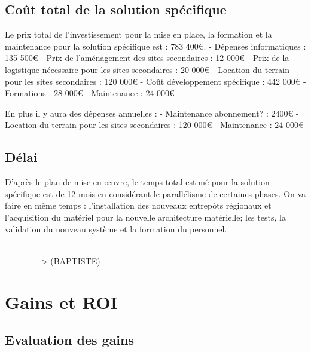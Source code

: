     \subsection{Coût total de la solution spécifique}

    Le prix total de l'investissement pour la mise en place, la formation et la maintenance pour la solution spécifique est : 783 400€.
          - Dépenses informatiques : 135 500€
          - Prix de l'aménagement des sites secondaires : 12 000€
          - Prix de la logistique nécessaire pour les sites secondaires : 20 000€
          - Location du terrain pour les sites secondaires : 120 000€
          - Coût développement spécifique : 442 000€
          - Formations : 28 000€
          - Maintenance : 24 000€

    En plus il y aura des dépenses annuelles :
          - Maintenance abonnement? : 2400€
          - Location du terrain pour les sites secondaires : 120 000€
          - Maintenance : 24 000€

        \subsection{Délai}

              D'après le plan de mise en œuvre, le temps total estimé pour la solution spécifique est de 12 mois en considérant le parallélisme de certaines phases. On va faire en même temps : l'installation des nouveaux entrepôts régionaux et l'acquisition du matériel pour la nouvelle architecture matérielle; les tests, la validation du nouveau système et la formation du personnel.

-------------------------------------------------------------------------------------------------------------------------> (BAPTISTE)

\section{Gains et ROI}
\subsection{Evaluation des gains}

